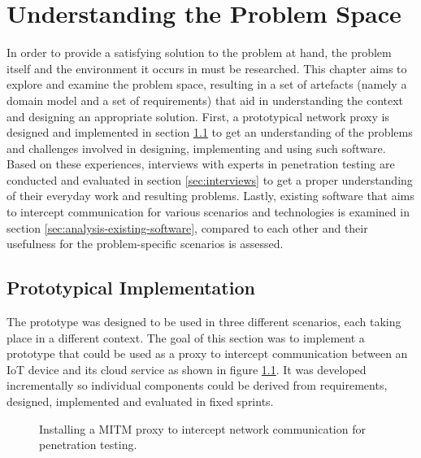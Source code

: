 \chapter{Understanding the Problem Space}
\label{chap:understanding-the-problem-space}
In order to provide a satisfying solution to the problem at hand, the problem itself and the environment it occurs in must be researched. This chapter aims to explore and examine the problem space, resulting in a set of artefacts (namely a domain model and a set of requirements) that aid in understanding the context and designing an appropriate solution. First, a prototypical network proxy is designed and implemented in section \ref{sec:prototypical-implementation} to get an understanding of the problems and challenges involved in designing, implementing and using such software. Based on these experiences, interviews with experts in penetration testing are conducted and evaluated in section \ref{sec:interviews} to get a proper understanding of their everyday work and resulting problems. Lastly, existing software that aims to intercept communication for various scenarios and technologies is examined in section \ref{sec:analysis-existing-software}, compared to each other and their usefulness for the problem-specific scenarios is assessed. %

\section{Prototypical Implementation}
\label{sec:prototypical-implementation}
The prototype was designed to be used in three different scenarios, each taking place in a different context. The goal of this section was to implement a prototype that could be used as a proxy to intercept communication between an \ac{IoT} device and its cloud service as shown in figure \ref{fig:network-communication-diagrams}. It was developed incrementally so individual components could be derived from requirements, designed, implemented and evaluated in fixed sprints.

\begin{figure}%
    \centering
    \qquad
    \caption{Installing a \ac{MITM} proxy to intercept network communication for penetration testing.}%
    \label{fig:network-communication-diagrams}%
\end{figure}

